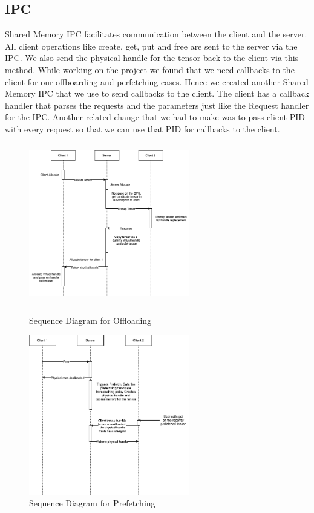 \documentclass{article}
\begin{document}
\subsection{IPC}
Shared Memory IPC facilitates communication between the client and the server. All client operations like
create, get, put and free are sent to the server via the IPC. We also send the physical handle for the 
tensor back to the client via this method. While working on the project we found that we need
callbacks to the client for our offboarding and perfetching cases. Hence we created another Shared Memory IPC 
that we use to send callbacks to the client. The client has a callback handler that parses the requests and the 
parameters just like the Request handler for the IPC. Another related change that we had to make was to pass
client PID with every request so that we can use that PID for callbacks to the client.

\begin{figure}[!htbp]
	\begin{minipage}{0.48\textwidth}
	  \centering
	  \includegraphics[height=7cm, width=7cm]{figures/Offloading.png}
	  \caption{Sequence Diagram for Offloading}
	\end{minipage}\hfill
	\begin{minipage}{0.48\textwidth}
	  \centering
	  \includegraphics[height=7cm, width=7cm]{figures/Prefetch.png}
	\caption{Sequence Diagram for Prefetching}
	\end{minipage}
\end{figure}
\end{document}
